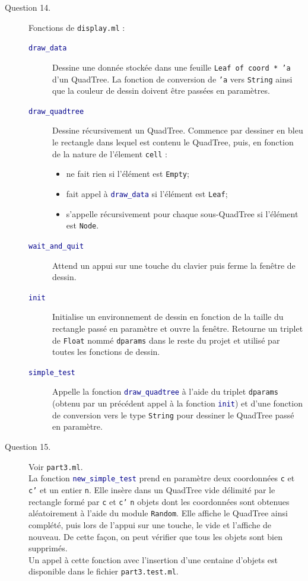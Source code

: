 \documentclass[11pt]{scrartcl}
\newcommand{\funname}[1]{\texttt{\textcolor{darkblue}{#1}}}
\newcommand{\filename}[1]{\texttt{\textcolor{darkbrown}{#1}}}
\newcommand{\code}[1]{\texttt{#1}}
\begin{document}
\begin{description}
\item[Question 14.] Fonctions de \filename{display.ml} :
\begin{description}
\item[\funname{draw_data}] Dessine une donnée stockée dans une feuille \code{Leaf of coord * 'a} d'un QuadTree. La fonction de conversion de \code{'a} vers \code{String} ainsi que la couleur de dessin doivent être passées en paramètres.
\item[\funname{draw_quadtree}] Dessine récursivement un QuadTree. Commence par dessiner en bleu le rectangle dans lequel est contenu le QuadTree, puis, en fonction de la nature de l'élement \code{cell} :
\begin{itemize}
\item ne fait rien si l'élément est \code{Empty};
\item fait appel à \funname{draw_data} si l'élément est \code{Leaf};
\item s'appelle récursivement pour chaque sous-QuadTree si l'élément est \code{Node}.
\end{itemize}
\item[\funname{wait_and_quit}] Attend un appui sur une touche du clavier puis ferme la fenêtre de dessin.
\item[\funname{init}] Initialise un environnement de dessin en fonction de la taille du rectangle passé en paramètre et ouvre la fenêtre. Retourne un triplet de \code{Float} nommé \code{dparams} dans le reste du projet et utilisé par toutes les fonctions de dessin. 
\item[\funname{simple_test}] Appelle la fonction \funname{draw_quadtree} à l'aide du triplet \code{dparams} (obtenu par un précédent appel à la fonction \funname{init}) et d'une fonction de conversion vers le type \code{String} pour dessiner le QuadTree passé en paramètre.
\end{description}

\item[Question 15.] Voir \filename{part3.ml}.\\
La fonction \funname{new_simple_test} prend en paramètre deux coordonnées \code{c} et \code{c'} et un entier \code{n}. Elle insère dans un QuadTree vide délimité par le rectangle formé par \code{c} et \code{c'} \code{n} objets dont les coordonnées sont obtenues aléatoirement à l'aide du module \code{Random}. Elle affiche le QuadTree ainsi complété, puis lors de l'appui sur une touche, le vide et l'affiche de nouveau. De cette façon, on peut vérifier que tous les objets sont bien supprimés.\\
Un appel à cette fonction avec l'insertion d'une centaine d'objets est disponible dans le fichier \filename{part3.test.ml}.


\end{description}
\end{document}
